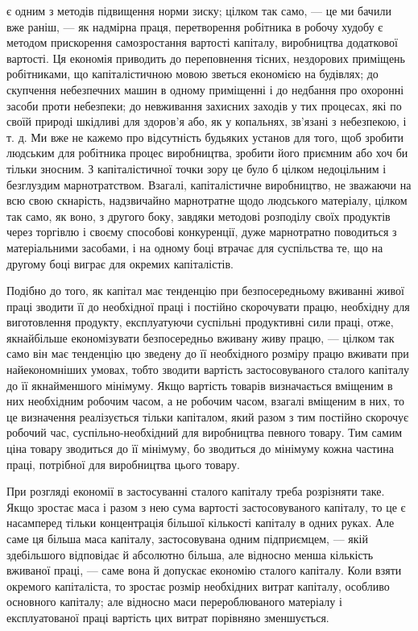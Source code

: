 \parcont{}  %
є одним з методів підвищення норми зиску; цілком так само, —
це ми бачили вже раніш, — як надмірна праця, перетворення
робітника в робочу худобу є методом прискорення самозростання вартості капіталу, виробництва
додаткової вартості.
Ця економія приводить до переповнення тісних, нездорових приміщень робітниками, що капіталістичною
мовою зветься економією на будівлях; до скупчення небезпечних машин в
одному приміщенні і до недбання про охоронні засоби проти
небезпеки; до невживання захисних заходів у тих процесах,
які по своїй природі шкідливі для здоров’я або, як у копальнях, зв’язані з небезпекою, і т. д. Ми
вже не кажемо про відсутність будьяких установ для того, щоб зробити людським для
робітника процес виробництва, зробити його приємним або хоч би
тільки зносним. З капіталістичної точки зору це було б цілком
недоцільним і безглуздим марнотратством. Взагалі, капіталістичне
виробництво, не зважаючи на всю свою скнарість, надзвичайно
марнотратне щодо людського матеріалу, цілком так само, як
воно, з другого боку, завдяки методові розподілу своїх продуктів через торгівлю і своєму способові
конкуренції, дуже марнотратно поводиться з матеріальними засобами, і на одному боці втрачає для
суспільства те, що на другому боці виграє для
окремих капіталістів.

Подібно до того, як капітал має тенденцію при безпосередньому вживанні живої праці зводити її до
необхідної праці і постійно скорочувати працю, необхідну для виготовлення продукту,
експлуатуючи суспільні продуктивні сили праці, отже, якнайбільше економізувати безпосередньо вживану
живу працю, —
цілком так само він має тенденцію цю зведену до її необхідного
розміру працю вживати при найекономніших умовах, тобто зводити вартість застосовуваного сталого
капіталу до її якнайменшого мінімуму. Якщо вартість товарів визначається вміщеним
в них необхідним робочим часом, а не робочим часом, взагалі
вміщеним в них, то це визначення реалізується тільки капіталом,
який разом з тим постійно скорочує робочий час, суспільно-необхідний
для виробництва певного товару. Тим самим ціна
товару зводиться до її мінімуму, бо зводиться до мінімуму кожна
частина праці, потрібної для виробництва цього товару.

При розгляді економії в застосуванні сталого капіталу треба
розрізняти таке. Якщо зростає маса і разом з нею сума вартості застосовуваного капіталу, то це є
насамперед тільки концентрація більшої кількості капіталу в одних руках. Але саме
ця більша маса капіталу, застосовувана одним підприємцем, —
якій здебільшого відповідає й абсолютно більша, але відносно
менша кількість вживаної праці, — саме вона й допускає економію сталого капіталу. Коли взяти
окремого капіталіста, то
зростає розмір необхідних витрат капіталу, особливо основного
капіталу; але відносно маси перероблюваного матеріалу і експлуатованої праці вартість цих витрат
порівняно зменшується.
